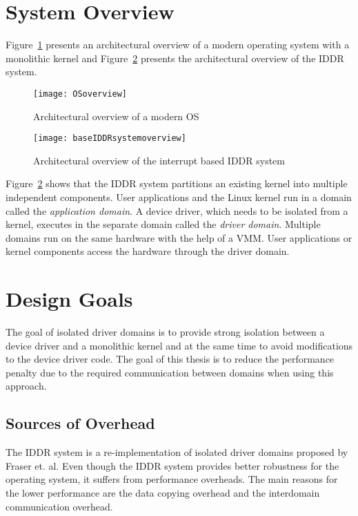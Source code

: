 \section{System Overview}\label{overview}

Figure~\ref{fig:monolithic} presents an architectural overview of a
modern operating system with a monolithic kernel and Figure~\ref{fig:base IDDR system overview} 
presents the architectural overview of the IDDR system.

\begin{figure}[!ht]
\centering
\texttt{[image: OSoverview]}
\caption{Architectural overview of a modern OS}
\label{fig:monolithic}
\end{figure}

\begin{figure}[!ht]
\centering
\texttt{[image: baseIDDRsystemoverview]}
\caption{Architectural overview of the interrupt based IDDR system}
\label{fig:base IDDR system overview}
\end{figure}

Figure~\ref{fig:base IDDR system overview} shows that the IDDR
system partitions an existing kernel into multiple independent
components.  User applications and the Linux kernel run in a domain
called the \textit{application domain}. A device driver, which needs
to be isolated from a kernel, executes in the separate domain called
the \textit{driver domain}. Multiple domains run on the same hardware
with the help of a VMM. User applications or kernel components access
the hardware through the driver domain.

\section{Design Goals}\label{sec:goals}
The goal of isolated driver domains is to provide strong isolation
between a device driver and a monolithic kernel and at the same time to
avoid modifications to the device driver code. The goal of this thesis
is to reduce the performance penalty due to the required communication 
between domains when using this approach.

\subsection*{Sources of Overhead}
\label{subsec:overhead}
The IDDR system is a re-implementation of isolated driver domains proposed
by Fraser et. al. Even though the IDDR system provides better robustness
for the operating system, it suffers from performance overheads. The
main reasons for the lower performance are the data copying overhead
and the interdomain communication overhead.

